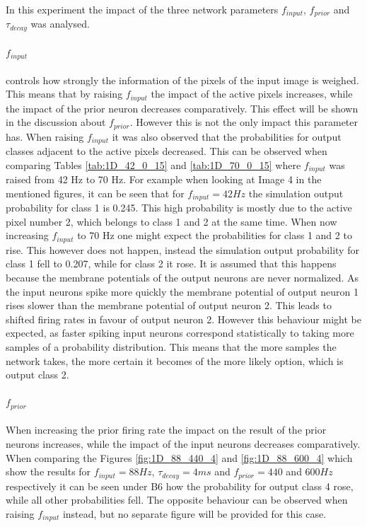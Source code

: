 In this experiment the impact of the three network parameters $f_{input}$, $f_{prior}$ and $\tau_{decay}$ was analysed.
\paragraph{$f_{input}$} controls how strongly the information of the pixels of the input image is weighed. This means that by raising $f_{input}$ the impact of the active pixels increases, while the impact of the prior neuron decreases comparatively. This effect will be shown in the discussion about $f_{prior}$. However this is not the only impact this parameter has. When raising $f_{input}$ it was also observed that the probabilities for output classes adjacent to the active pixels decreased. This can be observed when comparing Tables \ref{tab:1D_42_0_15} and \ref{tab:1D_70_0_15} where $f_{input}$ was raised from 42 Hz to 70 Hz. For example when looking at Image 4 in the mentioned figures, it can be seen that for $f_{input} = 42 Hz$ the simulation output probability for class 1 is 0.245. This high probability is mostly due to the active pixel number 2, which belongs to class 1 and 2 at the same time. When now increasing $f_{input}$ to 70 Hz one might expect the probabilities for class 1 and 2 to rise. This however does not happen, instead the simulation output probability for class 1 fell to 0.207, while for class 2 it rose.
It is assumed that this happens because the membrane potentials of the output neurons are never normalized. As the input neurons spike more quickly the membrane potential of output neuron 1 rises slower than the membrane potential of output neuron 2. This leads to shifted firing rates in favour of output neuron 2. However this behaviour might be expected, as faster spiking input neurons correspond statistically to taking more samples of a probability distribution. This means that the more samples the network takes, the more certain it becomes of the more likely option, which is output class 2.

\paragraph{$f_{prior}$} When increasing the prior firing rate the impact on the result of the prior neurons increases, while the impact of the input neurons decreases comparatively. When comparing the Figures \ref{fig:1D_88_440_4} and \ref{fig:1D_88_600_4} which show the results for $f_{input} = 88 Hz$, $\tau_{decay} = 4 ms$ and $f_{prior} = 440$ and $600 Hz$ respectively it can be seen under B6 how the probability for output class 4 rose, while all other probabilities fell. The opposite behaviour can be observed when raising $f_{input}$ instead, but no separate figure will be provided for this case.

